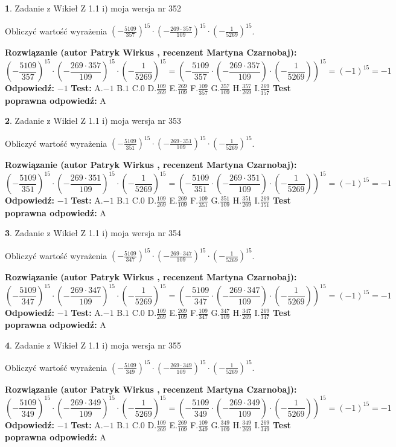 \documentclass[12pt, a4paper]{article}
\theoremstyle{definition} %
\newtheorem{zad}{}
\newcommand{\zadStart}[1]{\begin{zad}#1\newline}
\newcommand{\zadStop}{\end{zad}}
\newcommand{\rozwStart}[2]{\noindent \textbf{Rozwiązanie (autor #1 , recenzent #2): }\newline}
\newcommand{\rozwStop}{\newline}
\newcommand{\odpStart}{\noindent \textbf{Odpowiedź:}\newline}
\newcommand{\odpStop}{\newline}
\newcommand{\testStart}{\noindent \textbf{Test:}\newline}
\newcommand{\testStop}{\newline}
\newcommand{\kluczStart}{\noindent \textbf{Test poprawna odpowiedź:}\newline}
\newcommand{\kluczStop}{\newline}
\begin{document}
\zadStart{Zadanie z Wikieł Z 1.1 i) moja wersja nr 352}

Obliczyć wartość wyrażenia $(-\frac{5109}{357})^{15} \cdot (-\frac{269 \cdot 357}{109})^{15} \cdot (-\frac{1}{5269})^{15}$.
\zadStop
\rozwStart{Patryk Wirkus}{Martyna Czarnobaj}
$$(-\frac{5109}{357})^{15} \cdot (-\frac{269 \cdot 357}{109})^{15} \cdot (-\frac{1}{5269})^{15} = (-\frac{5109}{357} \cdot (-\frac{269 \cdot 357}{109}) \cdot (-\frac{1}{5269}))^{15} = (-1)^{15} = -1$$
\rozwStop
\odpStart
$-1$
\odpStop
\testStart
A.$-1$ B.$1$ C.$0$ D.$\frac{109}{269}$ E.$\frac{269}{109}$
F.$\frac{109}{357}$ G.$\frac{357}{109}$
H.$\frac{357}{269}$
I.$\frac{269}{357}$
\testStop
\kluczStart
A
\kluczStop



\zadStart{Zadanie z Wikieł Z 1.1 i) moja wersja nr 353}

Obliczyć wartość wyrażenia $(-\frac{5109}{351})^{15} \cdot (-\frac{269 \cdot 351}{109})^{15} \cdot (-\frac{1}{5269})^{15}$.
\zadStop
\rozwStart{Patryk Wirkus}{Martyna Czarnobaj}
$$(-\frac{5109}{351})^{15} \cdot (-\frac{269 \cdot 351}{109})^{15} \cdot (-\frac{1}{5269})^{15} = (-\frac{5109}{351} \cdot (-\frac{269 \cdot 351}{109}) \cdot (-\frac{1}{5269}))^{15} = (-1)^{15} = -1$$
\rozwStop
\odpStart
$-1$
\odpStop
\testStart
A.$-1$ B.$1$ C.$0$ D.$\frac{109}{269}$ E.$\frac{269}{109}$
F.$\frac{109}{351}$ G.$\frac{351}{109}$
H.$\frac{351}{269}$
I.$\frac{269}{351}$
\testStop
\kluczStart
A
\kluczStop



\zadStart{Zadanie z Wikieł Z 1.1 i) moja wersja nr 354}

Obliczyć wartość wyrażenia $(-\frac{5109}{347})^{15} \cdot (-\frac{269 \cdot 347}{109})^{15} \cdot (-\frac{1}{5269})^{15}$.
\zadStop
\rozwStart{Patryk Wirkus}{Martyna Czarnobaj}
$$(-\frac{5109}{347})^{15} \cdot (-\frac{269 \cdot 347}{109})^{15} \cdot (-\frac{1}{5269})^{15} = (-\frac{5109}{347} \cdot (-\frac{269 \cdot 347}{109}) \cdot (-\frac{1}{5269}))^{15} = (-1)^{15} = -1$$
\rozwStop
\odpStart
$-1$
\odpStop
\testStart
A.$-1$ B.$1$ C.$0$ D.$\frac{109}{269}$ E.$\frac{269}{109}$
F.$\frac{109}{347}$ G.$\frac{347}{109}$
H.$\frac{347}{269}$
I.$\frac{269}{347}$
\testStop
\kluczStart
A
\kluczStop



\zadStart{Zadanie z Wikieł Z 1.1 i) moja wersja nr 355}

Obliczyć wartość wyrażenia $(-\frac{5109}{349})^{15} \cdot (-\frac{269 \cdot 349}{109})^{15} \cdot (-\frac{1}{5269})^{15}$.
\zadStop
\rozwStart{Patryk Wirkus}{Martyna Czarnobaj}
$$(-\frac{5109}{349})^{15} \cdot (-\frac{269 \cdot 349}{109})^{15} \cdot (-\frac{1}{5269})^{15} = (-\frac{5109}{349} \cdot (-\frac{269 \cdot 349}{109}) \cdot (-\frac{1}{5269}))^{15} = (-1)^{15} = -1$$
\rozwStop
\odpStart
$-1$
\odpStop
\testStart
A.$-1$ B.$1$ C.$0$ D.$\frac{109}{269}$ E.$\frac{269}{109}$
F.$\frac{109}{349}$ G.$\frac{349}{109}$
H.$\frac{349}{269}$
I.$\frac{269}{349}$
\testStop
\kluczStart
A
\kluczStop
\end{document}
